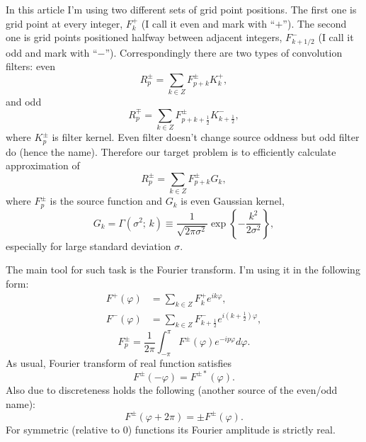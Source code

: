 \documentclass[10pt]{article}
\begin{document}
In this article I'm using two different sets of grid point positions. The first one is grid point at
every integer, $F^+_k$ (I call it even and mark with ``$+$''). The second one is grid points
positioned halfway between adjacent integers, $F^-_{k+1/2}$ (I call it odd and mark with ``$-$'').
Correspondingly there are two types of convolution filters: even
\begin{equation}\label{conv+}
    R^\pm_p = \sum_{k\in Z} F^\pm_{p+k}K^+_k,
\end{equation}
and odd
\begin{equation}\label{conv-}
    R^\mp_p = \sum_{k\in Z} F^\pm_{p+k+\frac12}K^-_{k+\frac12},
\end{equation}
where $K^\pm_p$ is filter kernel. Even filter doesn't change source oddness but odd filter do (hence
the name). Therefore our target problem is to efficiently calculate approximation of
\begin{equation}
    R^\pm_p = \sum_{k\in Z} F^\pm_{p+k}G_k,
\end{equation}
where $F^\pm_p$ is the source function and $G_k$ is even Gaussian kernel,
\begin{equation}\label{gamma}
    G_k = \Gamma(\sigma^2;\, k) \equiv
        \frac1{\sqrt{2\pi\sigma^2}}\exp\left\{-\frac{k^2}{2\sigma^2}\right\},
\end{equation}
especially for large standard deviation $\sigma$.

The main tool for such task is the Fourier transform. I'm using it in the following form:
\begin{align}
    F^+(\varphi) &= \sum_{k\in Z} F^+_k e^{ik\varphi},\\
    F^-(\varphi) &= \sum_{k\in Z} F^-_{k+\frac12} e^{i(k+\frac12)\varphi},
\end{align}
\begin{equation}
    F^\pm_p = \frac1{2\pi}\int_{-\pi}^\pi F^\pm(\varphi)e^{-ip\varphi}d\varphi.
\end{equation}
As usual, Fourier transform of real function satisfies
\begin{equation}
    F^\pm(-\varphi) = F^{\pm*}(\varphi).
\end{equation}
Also due to discreteness holds the following (another source of the even/odd name):
\begin{equation}
    F^\pm(\varphi+2\pi) = \pm F^\pm(\varphi).
\end{equation}
For symmetric (relative to 0) functions its Fourier amplitude is strictly real.
\end{document}
